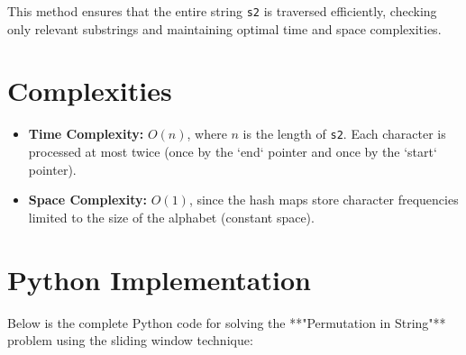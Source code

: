 This method ensures that the entire string \texttt{s2} is traversed efficiently, checking only relevant substrings and maintaining optimal time and space complexities.


\section*{Complexities}

\begin{itemize}
    \item \textbf{Time Complexity:} \(O(n)\), where \(n\) is the length of \texttt{s2}. Each character is processed at most twice (once by the `end` pointer and once by the `start` pointer).
    \item \textbf{Space Complexity:} \(O(1)\), since the hash maps store character frequencies limited to the size of the alphabet (constant space).
\end{itemize}

\section*{Python Implementation}


Below is the complete Python code for solving the **"Permutation in String"** problem using the sliding window technique:

